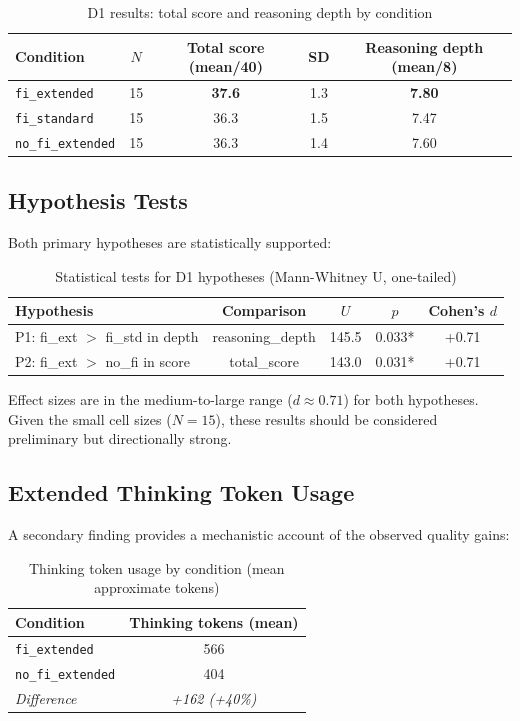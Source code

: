 \documentclass[11pt,a4paper]{article}
\begin{document}
\begin{table}[h]
\centering
\caption{D1 results: total score and reasoning depth by condition}
\begin{tabular}{lcccc}
\toprule
Condition & $N$ & Total score (mean/40) & SD & Reasoning depth (mean/8) \\
\midrule
\texttt{fi\_extended}    & 15 & \textbf{37.6} & 1.3 & \textbf{7.80} \\
\texttt{fi\_standard}    & 15 & 36.3          & 1.5 & 7.47          \\
\texttt{no\_fi\_extended} & 15 & 36.3         & 1.4 & 7.60          \\
\bottomrule
\end{tabular}
\end{table}

\subsection{Hypothesis Tests}

Both primary hypotheses are statistically supported:

\begin{table}[h]
\centering
\caption{Statistical tests for D1 hypotheses (Mann-Whitney U, one-tailed)}
\begin{tabular}{lcccc}
\toprule
Hypothesis & Comparison & $U$ & $p$ & Cohen's $d$ \\
\midrule
P1: fi\_ext $>$ fi\_std in depth  & reasoning\_depth & 145.5 & 0.033* & +0.71 \\
P2: fi\_ext $>$ no\_fi in score   & total\_score     & 143.0 & 0.031* & +0.71 \\
\bottomrule
\end{tabular}
\end{table}

Effect sizes are in the medium-to-large range ($d \approx 0.71$) for both
hypotheses. Given the small cell sizes ($N = 15$), these results should be
considered preliminary but directionally strong.

\subsection{Extended Thinking Token Usage}

A secondary finding provides a mechanistic account of the observed quality gains:

\begin{table}[h]
\centering
\caption{Thinking token usage by condition (mean approximate tokens)}
\begin{tabular}{lc}
\toprule
Condition & Thinking tokens (mean) \\
\midrule
\texttt{fi\_extended}    & 566 \\
\texttt{no\_fi\_extended} & 404 \\
\midrule
\textit{Difference}      & \textit{+162 (+40\%)} \\
\bottomrule
\end{tabular}
\end{table}
\end{document}
